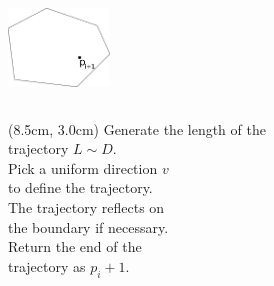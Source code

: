 \documentclass{beamer}
\begin{document}
\begin{frame}
\begin{columns}[t, totalwidth=7cm]
            \includegraphics[width=27mm]{../met_nets/resources/bill6.png}

      \end{columns}

      \begin{textblock*}{8.0cm}(8.5cm, 3.0cm)
         \footnotesize Generate the length of the \\ trajectory $L \sim D$. \\
         \bigbreak
         \footnotesize Pick a uniform direction $v$ \\ to define the trajectory. \\
         \bigbreak
         \footnotesize The trajectory reflects on \\ the boundary if necessary. \\
         \bigbreak
         \footnotesize Return the end of the \\ trajectory as $p_i+1$.
      \end{textblock*}

   
   \end{frame}

\end{document}

